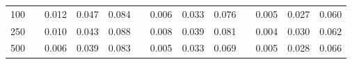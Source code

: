 % 
\begin{tabular}{ccccccccccccc}
  \hline
  \hline
100 &  & 0.012 & 0.047 & 0.084 &  & 0.006 & 0.033 & 0.076 &  & 0.005 & 0.027 & 0.060 \\ 
  250 &  & 0.010 & 0.043 & 0.088 &  & 0.008 & 0.039 & 0.081 &  & 0.004 & 0.030 & 0.062 \\ 
  500 &  & 0.006 & 0.039 & 0.083 &  & 0.005 & 0.033 & 0.069 &  & 0.005 & 0.028 & 0.066 \\ 
   \hline
\end{tabular}

